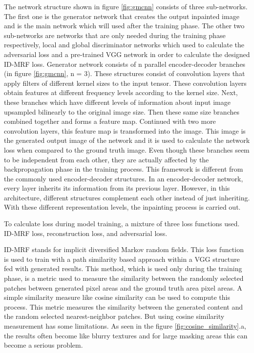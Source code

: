 The network structure shown in figure \ref{fig:gmcnn} consists of three sub-networks. The first one is the generator network that creates the output inpainted image and is the main network which will used after the training phase. The other two sub-networks are networks that are only needed during the training phase respectively, local and global discriminator networks which used to calculate the adversarial loss and a pre-trained VGG network \cite{very_deep_conv} in order to calculate the designed ID-MRF loss. Generator network consists of n parallel encoder-decoder branches (in figure \ref{fig:gmcnn}, n = 3). These structures consist of convolution layers that apply filters of different kernel sizes to the input tensor. These convolution layers obtain features at different frequency levels according to the kernel size. Next, these branches which have different levels of information about input image upsampled bilinearly to the original image size. Then these same size branches combined together and forms a feature map. Continued with two more convolution layers, this feature map is transformed into the image. This image is the generated output image of the network and it is used to calculate the network loss when compared to the ground truth image. Even though these branches seem to be independent from each other, they are actually affected by the backpropagation phase in the training process. This framework is different from the commonly used encoder-decoder structures. In an encoder-decoder network, every layer inherits its information from its previous layer. However, in this architecture, different structures complement each other instead of just inheriting. With these different representation levels, the inpainting process is carried out.

To calculate loss during model training, a mixture of three loss functions used. ID-MRF loss, reconstruction loss, and adversarial loss.

ID-MRF stands for implicit diversified Markov random fields. This loss function is used to train with a path similarity based approach within a VGG structure fed with generated results. This method, which is used only during the training phase, is a metric used to measure the similarity between the randomly selected patches between generated pixel areas and the ground truth area pixel areas. A simple similarity measure like cosine similarity can be used to compute this process. This metric measures the similarity between the generated content and the random selected nearest-neighbor patches. But using cosine similarity measurement has some limitations. As seen in the figure \ref{fig:cosine_similarity}.a, the results often become like blurry textures and for large masking areas this can become a serious problem.


